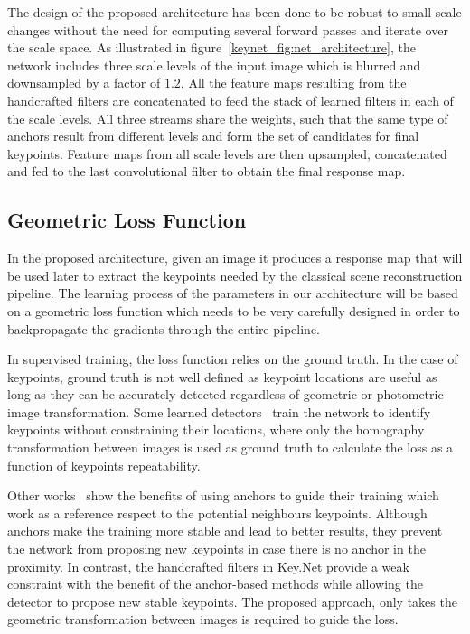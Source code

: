 The design of the proposed architecture has been done to be robust to small scale changes without the need for computing several forward passes and iterate over the scale space. As illustrated in figure~\ref{keynet_fig:net_architecture}, the network includes three scale levels of the input image which is blurred and downsampled by a factor of $1.2$. All the feature maps resulting from the handcrafted filters are concatenated to feed the stack of learned filters in each of the scale levels. All three streams share the weights, such that the same type of anchors result from different levels and form the set of candidates for final keypoints. Feature maps from all scale levels are then upsampled, concatenated and fed to the last convolutional filter to obtain the final response map. 


\subsection{Geometric Loss Function}
\label{keynet_sec:loss_functions}

In the proposed architecture, given an image it produces a response map that will be used later to extract the keypoints needed by the classical scene reconstruction pipeline. The learning process of the parameters in our architecture will be based on a geometric loss function which needs to be very carefully designed in order to backpropagate the gradients through the entire pipeline.

In supervised training, the loss function relies on the ground truth. In the case of keypoints, ground truth is not well defined as keypoint locations are useful as long as they can be accurately detected regardless of geometric or photometric image transformation. Some learned detectors~\cite{Karel_Vedaldi_ECCV_16,savinov2016quad,OnoSerra18} train the network to identify keypoints without constraining their locations, where only the homography transformation between images is used as ground truth to calculate the loss as a function of keypoints repeatability. 

Other works~\cite{TILDE,detone2017superpoint,Zhang_Felix_CVPR_17} show the benefits of using anchors to guide their training which work as a reference respect to the potential neighbours keypoints. Although anchors make the training more stable and lead to better results, they prevent the network from proposing new keypoints in case there is no anchor in the proximity. In contrast, the handcrafted filters in Key.Net provide a weak constraint with the benefit of the anchor-based methods while allowing the detector to propose new stable keypoints. The proposed approach, only takes the geometric transformation between images is required to guide the loss.


